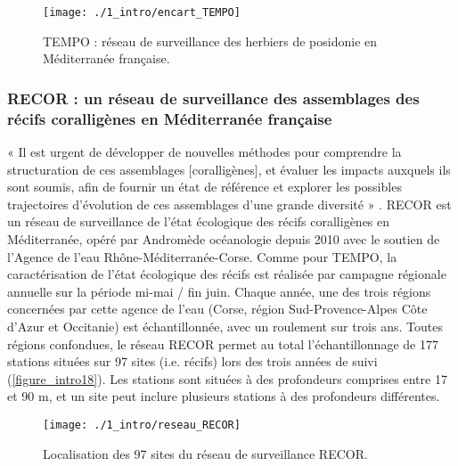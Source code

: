 \begin{sidewaysfigure}
\begin{figure}[H]
	\begin{center}
	\texttt{[image: ./1\_intro/encart\_TEMPO]}
		\caption[TEMPO : réseau de surveillance des herbiers de posidonie en Méditerranée française]{TEMPO : réseau de surveillance des herbiers de posidonie en Méditerranée française.}
	\label{figure_intro17}
\end{center}
\end{figure}
\end{sidewaysfigure}

\newpage

\subsubsection{RECOR : un réseau de surveillance des assemblages des récifs coralligènes en Méditerranée française}\label{intro.2.3.3}

« Il est urgent de développer de nouvelles méthodes pour comprendre la structuration de ces assemblages [coralligènes], et évaluer les impacts auxquels ils sont soumis, afin de fournir un état de référence et explorer les possibles trajectoires d’évolution de ces assemblages d’une grande diversité » \citep{kipson_rapid_2011}. RECOR est un réseau de surveillance de l’état écologique des récifs coralligènes en Méditerranée, opéré par Andromède océanologie depuis 2010 avec le soutien de l’Agence de l’eau Rhône-Méditerranée-Corse. Comme pour TEMPO, la caractérisation de l’état écologique des récifs est réalisée par campagne régionale annuelle sur la période mi-mai / fin juin. Chaque année, une des trois régions concernées par cette agence de l’eau (Corse, région Sud-Provence-Alpes Côte d’Azur et Occitanie) est échantillonnée, avec un roulement sur trois ans. Toutes régions confondues, le réseau RECOR permet au total l’échantillonnage de 177 stations situées sur 97 sites (i.e. récifs) lors des trois années de suivi (\autoref{figure_intro18}). Les stations sont situées à des profondeurs comprises entre 17 et 90 m, et un site peut inclure plusieurs stations à des profondeurs différentes.

\begin{figure}[H]
	\begin{center}
	\texttt{[image: ./1\_intro/reseau\_RECOR]}
		\caption[Localisation des 97 sites du réseau de surveillance RECOR]{Localisation des 97 sites du réseau de surveillance RECOR.}
	\label{figure_intro18}
\end{center}
\end{figure}

